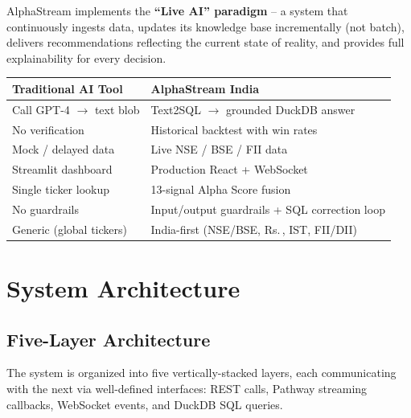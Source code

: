 \documentclass[11pt, a4paper]{article}
\newcommand{\Rs}{Rs.\,}
\begin{document}
AlphaStream implements the \textbf{``Live AI'' paradigm} -- a system that continuously ingests data,
updates its knowledge base incrementally (not batch), delivers recommendations reflecting the
current state of reality, and provides full explainability for every decision.

\begin{center}
\small
\begin{tabular}{L{5.5cm} L{7cm}}
  \toprule
  \textbf{Traditional AI Tool} & \textbf{AlphaStream India} \\
  \midrule
  Call GPT-4 $\to$ text blob & Text2SQL $\to$ grounded DuckDB answer \\
  No verification & Historical backtest with win rates \\
  Mock / delayed data & Live NSE / BSE / FII data \\
  Streamlit dashboard & Production React + WebSocket \\
  Single ticker lookup & 13-signal Alpha Score fusion \\
  No guardrails & Input/output guardrails + SQL correction loop \\
  Generic (global tickers) & India-first (NSE/BSE, \Rs{}, IST, FII/DII) \\
  \bottomrule
\end{tabular}
\end{center}

\section{System Architecture}
\label{sec:arch}

\subsection{Five-Layer Architecture}

The system is organized into five vertically-stacked layers, each communicating
with the next via well-defined interfaces: REST calls, Pathway streaming callbacks,
WebSocket events, and DuckDB SQL queries.
\end{document}

